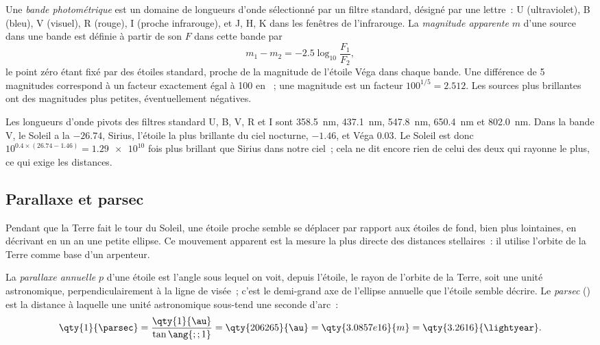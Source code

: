 \begin{definition}\label{def:b1:observing-the-sky:magnitude}
Une \emph{bande photométrique} est un domaine de longueurs d'onde
sélectionné par un filtre standard, désigné par une lettre~: U (ultraviolet),
B (bleu), V (visuel), R (rouge), I (proche infrarouge), et J, H, K dans les
fenêtres de l'infrarouge. La \emph{magnitude apparente} $m$ d'une source dans une
bande est définie à partir de son  $F$ dans cette bande par
\[
  m_1 - m_2 = -2.5\log_{10}\frac{F_1}{F_2} ,
\]
le point zéro étant fixé par des étoiles standard, proche de la magnitude de
l'étoile Véga dans chaque bande. Une différence de 5 magnitudes correspond à un
facteur exactement égal à 100 en ~; une magnitude est un facteur
$100^{1/5} = 2.512$. Les sources plus brillantes ont des magnitudes plus
petites, éventuellement négatives.
\end{definition}

Les longueurs d'onde pivots des filtres standard U, B, V, R et I sont
\qty{358.5}{nm}, \qty{437.1}{nm}, \qty{547.8}{nm}, \qty{650.4}{nm} et
\qty{802.0}{nm}.
Dans la bande V, le Soleil a la  $-26.74$, Sirius, l'étoile
la plus brillante du ciel nocturne, $-1.46$, et Véga $0.03$. Le Soleil est donc
$10^{0.4\times(26.74 - 1.46)} = \num{1.29e10}$ fois plus brillant que Sirius
dans notre ciel~; cela ne dit encore rien de celui des deux qui rayonne le plus,
ce qui exige les distances.

\subsection*{Parallaxe et parsec}

Pendant que la Terre fait le tour du Soleil, une étoile proche semble se
déplacer par rapport aux étoiles de fond, bien plus lointaines, en décrivant en
un an une petite ellipse. Ce mouvement apparent est la mesure la plus directe
des distances stellaires~: il utilise l'orbite de la Terre comme base d'un
arpenteur.

\begin{definition}\label{def:b1:observing-the-sky:parallax}
La \emph{parallaxe annuelle} $p$ d'une étoile est l'angle sous lequel on voit, depuis
l'étoile, le rayon de l'orbite de la Terre, soit une unité astronomique,
perpendiculairement à la ligne de visée~; c'est le demi-grand axe de l'ellipse
annuelle que l'étoile semble décrire. Le
\emph{parsec} (\unit{\parsec}) est la distance à laquelle une
unité astronomique sous-tend une seconde d'arc~:
\[
  \qty{1}{\parsec} = \frac{\qty{1}{\au}}{\tan\ang{;;1}} = \qty{206265}{\au}
  = \qty{3.0857e16}{m} = \qty{3.2616}{\lightyear} .
\]
\end{definition}

